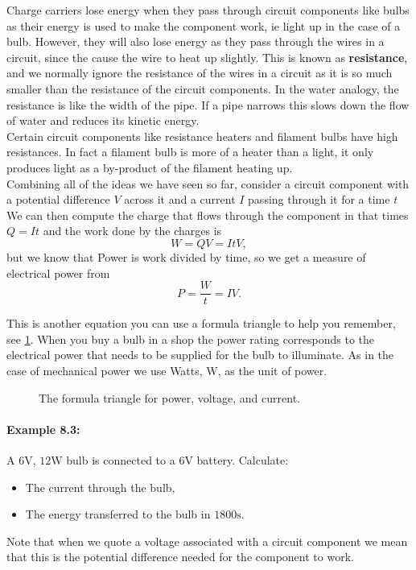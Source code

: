 Charge carriers lose energy when they pass through circuit components like bulbs as their energy is used to make the component work, ie light up in the case of a bulb. However, they will also lose energy as they pass through the wires in a circuit, since the cause the wire to heat up slightly. This is known as \textbf{resistance}, and we normally ignore the resistance of the wires in a circuit as it is so much smaller than the resistance of the circuit components. In the water analogy, the resistance is like the width of the pipe. If a pipe narrows this slows down the flow of water and reduces its kinetic energy.\\

Certain circuit components like resistance heaters and filament bulbs have high resistances. In fact a filament bulb is more of a heater than a light, it only produces light as a by-product of the filament heating up.\\

Combining all of the ideas we have seen so far, consider a circuit component with a potential difference $V$ across it and a current $I$ passing through it for a time $t$ We can then compute the charge that flows through the component in that times $Q=It$ and the work done by the charges is
\begin{equation*}
W=QV=ItV,
\end{equation*}
but we know that Power is work divided by time, so we get a measure of electrical power from
\begin{equation*}
P=\frac{W}{t}=IV.
\end{equation*}

This is another equation you can use a formula triangle to help you remember, see \cref{fig: PIV triangle}.   When you buy a bulb in a shop the power rating corresponds to the electrical power that needs to be supplied for the bulb to illuminate. As in the case of mechanical power we use Watts, $\text{W}$, as the unit of power.

\begin{figure}[ht]
    \centering
  \large {}
    \caption{The formula triangle for power, voltage, and current. }
    \label{fig: PIV triangle}
\end{figure}


\paragraph{Example 8.3:} A $6\text{V}$, $12\text{W}$ bulb is connected to a $6\text{V}$ battery. Calculate:
\begin{itemize}
\setlength{\itemsep}{-5pt}
    \item[a)] The current through the bulb,
    \item[b)] The energy transferred to the bulb in $1800\text{s}$.
\end{itemize}  
Note that when we quote a voltage associated with a circuit component we mean that this is the potential difference needed for the component to work.\\

